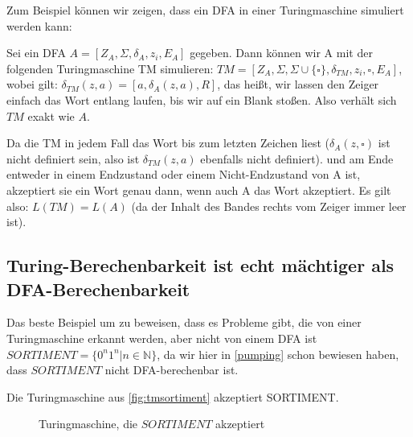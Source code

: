 Zum Beispiel können wir zeigen,
dass ein DFA in einer Turingmaschine simuliert werden kann:

Sei ein DFA $A = [Z_A, \Sigma, \delta_A, z_i, E_A]$ gegeben.
Dann können wir A mit der folgenden Turingmaschine TM simulieren:
$TM = [Z_A, \Sigma, \Sigma \cup \{\square\}, \delta_{TM}, z_i, \square, E_A]$,
wobei gilt:
$\delta_{TM}(z, a) = [a, \delta_A(z, a), R]$,
das heißt, wir lassen den Zeiger einfach das Wort entlang laufen,
bis wir auf ein Blank stoßen.
Also verhält sich $TM$ exakt wie $A$.

Da die TM in jedem Fall das Wort bis zum letzten Zeichen liest
($\delta_A(z, \square)$ ist nicht definiert sein,
also ist $\delta_{TM}(z, a)$ ebenfalls nicht definiert).
und am Ende entweder in einem Endzustand oder einem Nicht-Endzustand von A ist,
akzeptiert sie ein Wort genau dann, wenn auch A das Wort akzeptiert. 
Es gilt also: $L(TM) = L(A)$ (da der Inhalt des Bandes rechts vom Zeiger immer leer ist).

\subsection{Turing-Berechenbarkeit ist echt mächtiger als DFA-Berechenbarkeit}
Das beste Beispiel um zu beweisen,
dass es Probleme gibt, die von einer Turingmaschine erkannt werden,
aber nicht von einem DFA ist $SORTIMENT = \{0^n1^n| n \in \mathbb{N}\}$,
da wir hier in \autoref{pumping} schon bewiesen haben,
dass $SORTIMENT$ nicht DFA-berechenbar ist.

Die Turingmaschine aus \autoref{fig:tmsortiment} akzeptiert SORTIMENT.

\begin{figure}[ht] %
\centering %
\caption{Turingmaschine, die $SORTIMENT$ akzeptiert}
\label{fig:tmsortiment}
\end{figure}

